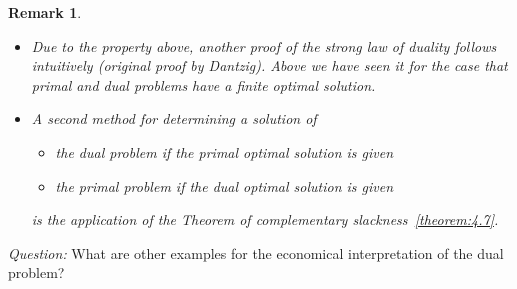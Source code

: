 \documentclass[a4paper]{article}
\numberwithin{lecref}{subsection}
\newtheorem*{Remark}{Remark}
\begin{document}
\begin{Remark}
	\begin{itemize}
		\item
			Due to the property above, another proof of the strong law of duality follows intuitively (original proof by Dantzig).
			Above we have seen it for the case that primal and dual problems have a finite optimal solution.
		\item
			A second method for determining a solution of
			\begin{itemize}
				\item the dual problem if the primal optimal solution is given
				\item the primal problem if the dual optimal solution is given
			\end{itemize}
			is the application of the Theorem of complementary slackness~\ref{theorem:4.7}.
	\end{itemize}
\end{Remark}

\emph{Question:} What are other examples for the economical interpretation of the dual problem?
\end{document}
